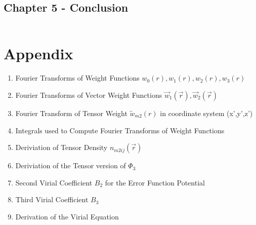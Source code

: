 \documentclass[double,12pt]{beavtex}
\begin{document}
\[{}\]
\[{}\]
\[{}\]
\[{}\]

\[{}\]
\[{}\]
\[{}\]
\[{}\]


\[{}\]
\[{}\]
\[{}\]
\[{}\]

\[{}\]
\[{}\]
\[{}\]
\[{}\]

\section{Chapter 5 -  Conclusion}


\[{}\]
\[{}\]
\[{}\]
\[{}\]

\backmatter

\chapter{Appendix}
\begin{enumerate}

\item Fourier Transforms of Weight Functions $w_0(r), w_1(r), w_2(r), w_3(r)$
\item Fourier Transforms of Vector Weight Functions $\vec{w}_1(\vec{r}), \vec{w}_2(\vec{r})$  
\item Fourier Transform of Tensor Weight $\overleftrightarrow{w}_{m2}(r)$ in coordinate system (x',y',z')
\item Integrals used to Compute Fourier Transforms of Weight Functions
\item Deriviation of Tensor Density $n_{m2ij}(\vec{r})$ 
\item Deriviation of the Tensor version of $\Phi_3$ 
\item Second Virial Coefficient $B_{2}$ for the Error Function Potential 
\item Third Virial Coefficient $B_{3}$
\item Derivation of the Virial Equation
\end{enumerate}
\end{document}
